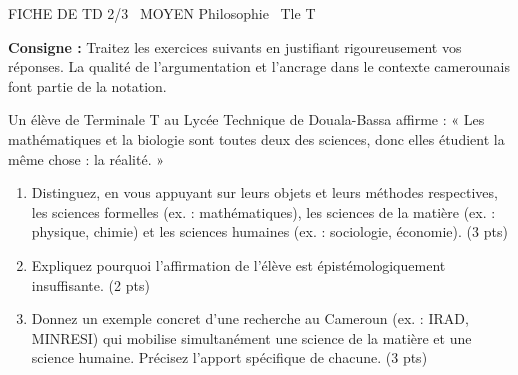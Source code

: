 \documentclass[11pt]{article}
\begin{document}
\begin{tcolorbox}[enhanced,colback=popink,colframe=popink,arc=10pt,boxrule=0pt,left=12pt,right=12pt,top=9pt,bottom=9pt]
{\color{white}\popxbold\small FICHE DE TD 2/3 \textbullet\ MOYEN \hfill Philosophie \textbullet\ Tle T\par}
\end{tcolorbox}
\vspace{4pt}
\noindent \textbf{Consigne :} Traitez les exercices suivants en justifiant rigoureusement vos réponses. La qualité de l'argumentation et l'ancrage dans le contexte camerounais font partie de la notation.

\begin{exercice}
Un élève de Terminale T au Lycée Technique de Douala-Bassa affirme : « Les mathématiques et la biologie sont toutes deux des sciences, donc elles étudient la même chose : la réalité. » 
\begin{enumerate}
    \item Distinguez, en vous appuyant sur leurs objets et leurs méthodes respectives, les sciences formelles (ex. : mathématiques), les sciences de la matière (ex. : physique, chimie) et les sciences humaines (ex. : sociologie, économie). (3 pts)
    \item Expliquez pourquoi l'affirmation de l'élève est épistémologiquement insuffisante. (2 pts)
    \item Donnez un exemple concret d'une recherche au Cameroun (ex. : IRAD, MINRESI) qui mobilise simultanément une science de la matière et une science humaine. Précisez l'apport spécifique de chacune. (3 pts)
\end{enumerate}
\end{exercice}
\end{document}
